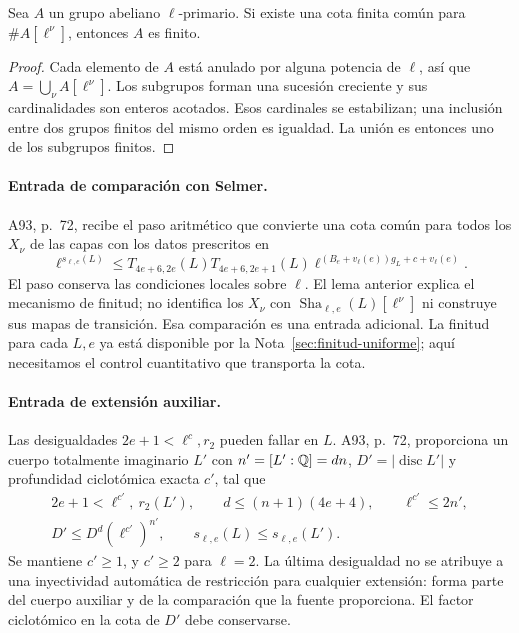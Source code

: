 \begin{lema}
\label{lem:cf-limite}
Sea $A$ un grupo abeliano $\ell$-primario. Si existe una cota
finita común para $\#A[\ell^\nu]$, entonces $A$ es finito.
\end{lema}

\begin{proof}
Cada elemento de $A$ está anulado por alguna potencia de $\ell$,
así que $A=\bigcup_\nu A[\ell^\nu]$.
Los subgrupos forman una sucesión creciente y sus cardinalidades
son enteros acotados. Esos cardinales se estabilizan; una inclusión
entre dos grupos finitos del mismo orden es igualdad.
La unión es entonces uno de los subgrupos finitos.
\end{proof}

\paragraph{Entrada de comparación con Selmer.}
A93, p.~72, recibe el paso aritmético que convierte una cota
común para todos los $X_\nu$ de las capas con los datos
prescritos en
\begin{equation}
 \ell^{s_{\ell,e}(L)}
 \le T_{4e+6,2e}(L)T_{4e+6,2e+1}(L)
 \ell^{(B_e+v_\ell(e))g_L+c+v_\ell(e)}.
 \label{eq:cf-selmer-entrada}
\end{equation}
El paso conserva las condiciones locales sobre $\ell$.
El lema anterior explica el mecanismo de finitud; no identifica
los $X_\nu$ con $\operatorname{Sha}_{\ell,e}(L)[\ell^\nu]$
ni construye sus mapas de transición. Esa comparación es una
entrada adicional. La finitud para cada $L,e$ ya está disponible
por la Nota~\ref{sec:finitud-uniforme}; aquí necesitamos el
control cuantitativo que transporta la cota.

\paragraph{Entrada de extensión auxiliar.}
Las desigualdades $2e+1<\ell^c,r_2$ pueden fallar en $L$.
A93, p.~72, proporciona un cuerpo totalmente imaginario $L'$
con $n'=[L':\mathbb{Q}]=dn$, $D'=|\operatorname{disc}L'|$ y profundidad
ciclotómica exacta $c'$, tal que
\begin{equation}
 \begin{gathered}
 2e+1<\ell^{c'},\ r_2(L'),\qquad
 d\le(n+1)(4e+4),\qquad \ell^{c'}\le2n',\\
 D'\le D^d(\ell^{c'})^{n'},\qquad
 s_{\ell,e}(L)\le s_{\ell,e}(L').
 \end{gathered}
 \label{eq:cf-extension}
\end{equation}
Se mantiene $c'\ge1$, y $c'\ge2$ para $\ell=2$.
La última desigualdad no se atribuye a una inyectividad automática
de restricción para cualquier extensión: forma parte del cuerpo
auxiliar y de la comparación que la fuente proporciona.
El factor ciclotómico en la cota de $D'$ debe conservarse.

